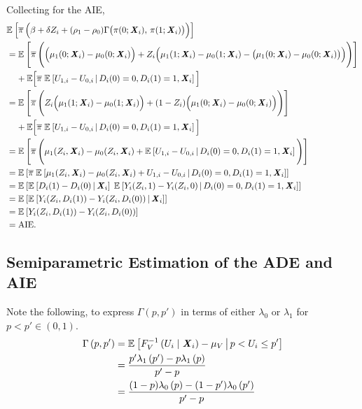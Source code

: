 Collecting for the AIE,
\begin{align*}
    &\mathbb{E}_{} \left[  \overline{\pi} \, \Big( \beta +  \delta Z_i +
        (\rho_1 - \rho_0) \Gamma \big(\pi(0; \boldsymbol{\mathit{X}}_i), \, \pi(1; \boldsymbol{\mathit{X}}_i) \big) \Big)  \right] \\
    &= \mathbb{E}_{} \left[  \overline{\pi} \, \Bigg( \Big( \mu_1(0; \boldsymbol{\mathit{X}}_i) - \mu_0(0; \boldsymbol{\mathit{X}}_i) \Big)
        +  Z_i \Big( \mu_1(1; \boldsymbol{\mathit{X}}_i) - \mu_0(1; \boldsymbol{\mathit{X}}_i)
            - \big(\mu_1(0; \boldsymbol{\mathit{X}}_i) - \mu_0(0; \boldsymbol{\mathit{X}}_i) \big) \Big) \Bigg)  \right] \\
    &\;\;\;\; + \mathbb E \Big[ \overline{\pi} \; \mathbb{E}_{} \left[  U_{1,i} - U_{0,i}  \, \middle\vert \, D_i(0) = 0, D_i(1) = 1, \boldsymbol{\mathit{X}}_i \right] \Big] \\
    &= \mathbb{E}_{} \left[  \overline{\pi} \, \Bigg(
        Z_i \Big( \mu_1(1; \boldsymbol{\mathit{X}}_i) - \mu_0(1; \boldsymbol{\mathit{X}}_i) \Big)
        + (1 - Z_i) \Big( \mu_1(0; \boldsymbol{\mathit{X}}_i) - \mu_0(0; \boldsymbol{\mathit{X}}_i) \Big) \Bigg)  \right] \\
    &\;\;\;\; + \mathbb E \Big[ \overline{\pi} \; \mathbb{E}_{} \left[  U_{1,i} - U_{0,i}  \, \middle\vert \, D_i(0) = 0, D_i(1) = 1, \boldsymbol{\mathit{X}}_i \right] \Big] \\
    &= \mathbb{E}_{} \left[  \overline{\pi} \, \Bigg(
        \mu_1(Z_i, \boldsymbol{\mathit{X}}_i) - \mu_0(Z_i, \boldsymbol{\mathit{X}}_i)
        + \mathbb{E}_{} \left[  U_{1,i} - U_{0,i}  \, \middle\vert \, D_i(0) = 0, D_i(1) = 1, \boldsymbol{\mathit{X}}_i \right] \Bigg)  \right] \\
    &= \mathbb{E}_{} \left[  \overline{\pi} \; \mathbb{E}_{} \left[ 
        \mu_1(Z_i, \boldsymbol{\mathit{X}}_i) - \mu_0(Z_i, \boldsymbol{\mathit{X}}_i) + U_{1,i} - U_{0,i}  \, \middle\vert \, 
            D_i(0) = 0, D_i(1) = 1, \boldsymbol{\mathit{X}}_i \right]  \right] \\
    &= \mathbb{E}_{} \left[  \mathbb{E}_{} \left[ D_i(1) - D_i(0) \, \middle\vert \, \boldsymbol{\mathit{X}}_i \right] \; \mathbb{E}_{} \left[ 
        Y_i(Z_i, 1) - Y_i(Z_i, 0)  \, \middle\vert \,  D_i(0) = 0, D_i(1) = 1, \boldsymbol{\mathit{X}}_i \right]  \right] \\
    &= \mathbb{E}_{} \left[  \mathbb{E}_{} \left[ Y_i(Z_i,D_i(1)) - Y_i(Z_i,D_i(0)) \, \middle\vert \, \boldsymbol{\mathit{X}}_i \right]  \right] \\
    &= \mathbb{E}_{} \left[  Y_i(Z_i,D_i(1)) - Y_i(Z_i,D_i(0))  \right] \\
    &= \text{AIE}.
\end{align*}

\subsection{Semiparametric Estimation of the ADE and AIE}
\label{appendix:semiparametric}
Note the following, to express $\Gamma(p,p')$ in terms of either $\lambda_0$ or $\lambda_1$
for $p < p' \in (0,1)$.
\begin{align*}
    \Gamma\left(p,p'\right) 
        &= \mathbb{E}_{} \left[  F_V^{-1}\left( U_i \mid \boldsymbol{\mathit{X}}_i \right) - \mu_V \, \middle\vert \, p < U_i \leq p' \right] \\
        &= \frac{p'\lambda_1\left(p'\right) - p\lambda_1\left(p\right)}{p' - p} \\
        &= \frac{(1-p)\lambda_0\left(p\right) - (1-p')\lambda_0\left(p'\right)}{p' - p} \\
\end{align*}

